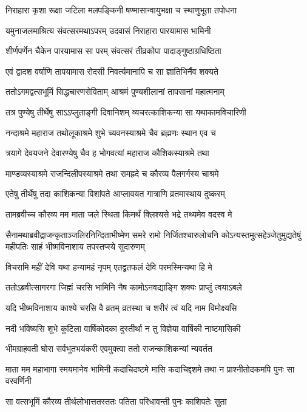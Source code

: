 \twolineshloka
{निराहारा कृशा रूक्षा जटिला मलपङ्किनी}
{षण्मासान्वायुभक्षा च स्थाणुभूता तपोधना}


\twolineshloka
{यमुनाजलमाश्रित्य संवत्सरमथाऽपरम्}
{उदवासं निराहारा पारयामास भामिनी}


\twolineshloka
{शीर्णपर्णेन चैकेन पारयामास सा परम्}
{संवत्सरं तीव्रकोपा पादाङ्गुष्ठाग्रधिष्ठिता}


\twolineshloka
{एवं द्वादश वर्षाणि तापयामास रोदसी}
{निवर्त्यमानापि च सा ज्ञातिभिर्नैव शक्यते}


\twolineshloka
{ततोऽगमद्वत्सभूमिं सिद्धचारणसेविताम्}
{आश्रमं पुण्यशीलानां तापसानां महात्मनाम्}


\twolineshloka
{तत्र पुण्येषु तीर्थेषु साऽऽप्लुताङ्गी दिवानिशम्}
{व्यचरत्काशिकन्या सा यथाकामविचारिणी}


\twolineshloka
{नन्दाश्रमे महाराज तथोलूकाश्रमे शुभे}
{च्यवनस्याश्रमे चैव ब्रह्मणः स्थान एव च}


\twolineshloka
{त्रयागे देवयजने देवारण्येषु चैव ह}
{भोगवत्यां महाराज कौशिकस्याश्रमे तथा}


\twolineshloka
{माण्डव्यस्याश्रमे राजन्दिलीपस्याश्रमे तथा}
{रामह्रदे च कौरव्य पैलगर्गस्य चाश्रमे}


\twolineshloka
{एतेषु तीर्थेषु तदा काशिकन्या विशांपते}
{आप्लावयत गात्राणि व्रतमास्थाय दुष्करम्}


\twolineshloka
{तामब्रवीच्च कौरव्य मम माता जले स्थिता}
{किमर्थं क्लिश्यसे भद्रे तथ्यमेव वदस्व मे}


सैनामथाब्रवीद्राजन्कृताञ्जलिरनिन्दिताभीष्मेण समरे रामो निर्जितश्चारुलोचनि
\twolineshloka
{कोऽन्यस्तमुत्सहेञ्जेतुमुद्यतेषुं महीपतिः}
{साहं भीष्मविनाशाय तपस्तप्स्ये सुदारुणम्}


\twolineshloka
{विचरामि महीं देवि यथा हन्यामहं नृपम्}
{एतद्व्रतफलं देवि परमस्मिन्यथा हि मे}


\twolineshloka
{ततोऽब्रवीत्सागरगा जिह्मं चरसि भामिनि}
{नैष कामोऽनवद्याङ्गि शक्यः प्राप्तुं त्वयाऽबले}


\twolineshloka
{यदि भीष्मविनाशाय काश्ये चरसि वै व्रतम्}
{व्रतस्था च शरीरं त्वं यदि नाम विमोक्ष्यसि}


\twolineshloka
{नदी भविष्यसि शुभे कुटिला वार्षिकोदका}
{दुस्तीर्था न तु विज्ञेया वार्षिकी नाष्टमासिकी}


\twolineshloka
{भीमग्राहवती घोरा सर्वभूतभयंकरी}
{एवमुक्त्वा ततो राजन्काशिकन्यां न्यवर्तत}


\threelineshloka
{माता मम महाभागा स्मयमानेव भामिनी}
{कदाचिदष्टमे मासि कदाचिद्दशमे तथा}
{न प्राश्नीतोदकमपि पुनः सा वरवर्णिनी}


\twolineshloka
{सा वत्सभूमिं कौरव्य तीर्थलोभात्ततस्ततः}
{पतिता परिधावन्ती पुनः काशिपतेः सुता}



